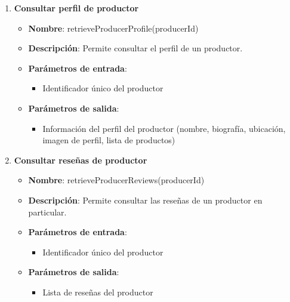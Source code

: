 \begin{enumerate}[label=SOP-\protect\twodigits{\arabic*}:, align=left, leftmargin=*]
\item \textbf{Consultar perfil de productor}
\begin{itemize}
\item \textbf{Nombre}: retrieveProducerProfile(producerId)
\item \textbf{Descripción}: Permite consultar el perfil de un productor.
\item \textbf{Parámetros de entrada}:
\begin{itemize}
\item Identificador único del productor
\end{itemize}
\item \textbf{Parámetros de salida}:
\begin{itemize}
\item Información del perfil del productor (nombre, biografía, ubicación, imagen de perfil, lista de productos)
\end{itemize}
\end{itemize}

\item \textbf{Consultar reseñas de productor}
\begin{itemize}
\item \textbf{Nombre}: retrieveProducerReviews(producerId)
\item \textbf{Descripción}: Permite consultar las reseñas de un productor en particular.
\item \textbf{Parámetros de entrada}:
\begin{itemize}
\item Identificador único del productor
\end{itemize}
\item \textbf{Parámetros de salida}:
\begin{itemize}
\item Lista de reseñas del productor
\end{itemize}
\end{itemize}


\end{enumerate}
